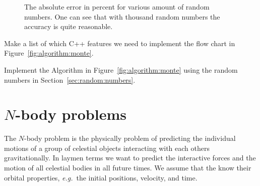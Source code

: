 \begin{figure}[tb]
\centering
{}
\caption{The absolute error in percent for various amount of random numbers. One can see that with thousand random numbers the accuracy is quite reasonable. }
\label{fig:monte:carlo}
\end{figure}

\begin{exercise}
Make a list of which C++ features we need to implement the flow chart in Figure~\ref{fig:algorithm:monte}.
\end{exercise}

\begin{exercise}
Implement the Algorithm in Figure~\ref{fig:algorithm:monte} using the random numbers in Section~\ref{sec:random:numbers}.
\end{exercise}


\chapter{$N$-body problems}
\label{sec:nbody}
The $N$-body problem is the physically problem of predicting the individual motions of a group of celestial objects interacting with each others gravitationally. In laymen terms we want to predict the interactive forces and the motion of all celestial bodies in all future times. We assume that the know their orbital properties, \emph{e.g.}\ the initial positions, velocity, and time.\\

